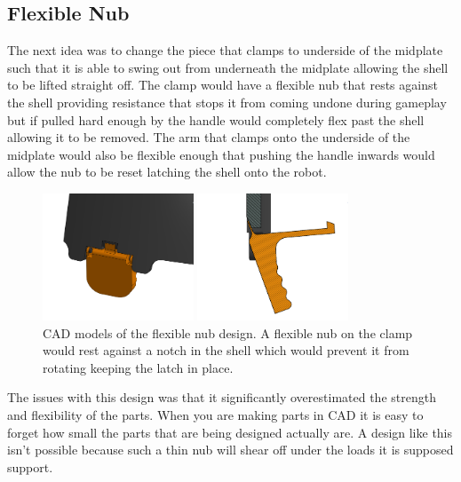 \documentclass{iopart}
\begin{document}
\subsection{Flexible Nub}

The next idea was to change the piece that clamps to underside of the midplate such that it is able to swing out from underneath the midplate allowing the shell to be lifted straight off. The clamp would have a flexible nub that rests against the shell providing resistance that stops it from coming undone during gameplay but if pulled hard enough by the handle would completely flex past the shell allowing it to be removed. The arm that clamps onto the underside of the midplate would also be flexible enough that pushing the handle inwards would allow the nub to be reset latching the shell onto the robot.

\begin{figure}[h!]
    \centering
    \includegraphics[width=0.4\textwidth]{graphics/flexible_nub1.png}
    \includegraphics[width=0.4\textwidth]{graphics/flexible_nub2.png}\\
    CAD models of the flexible nub design. A flexible nub on the clamp would rest against a notch in the shell which would prevent it from rotating keeping the latch in place.
\end{figure}

The issues with this design was that it significantly overestimated the strength and flexibility of the parts. When you are making parts in CAD it is easy to forget how small the parts that are being designed actually are. A design like this isn't possible because such a thin nub will shear off under the loads it is supposed support.
\end{document}
